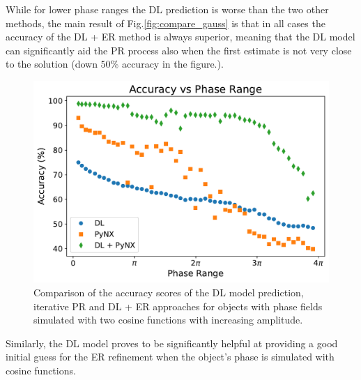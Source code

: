 While for lower phase ranges the DL prediction is worse than the two other methods, the main result of Fig.\ref{fig:compare_gauss} 
is that in all cases the accuracy of the DL + ER method is always superior, meaning that the DL model can significantly 
aid the PR process also when the first estimate is not very close to the solution (down $50\%$ accuracy in the figure.).

\begin{figure}[H]
    \centering
    \includegraphics[width=\textwidth]{figures/Phasing/plot_acc_comparison_cosine_winter.pdf}
    \caption{Comparison of the accuracy scores of the DL model prediction, iterative PR and DL + ER approaches for objects with 
    phase fields simulated with two cosine functions with increasing amplitude. }
    \label{fig:compare_cosine}
\end{figure}

Similarly, the DL model proves to be significantly helpful at providing a good initial guess for the ER refinement when 
the object's phase is simulated with cosine functions. 

